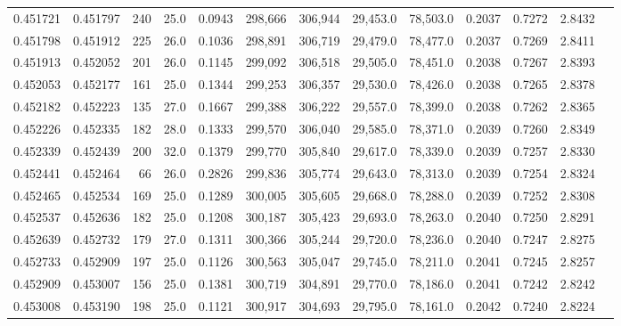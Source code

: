 \begin{tabular}{rrrrrrrrrrrrr}
0.451721 & 0.451797 &   240 & 25.0 &                                     0.0943 & 298,666 & 306,944 &  29,453.0 &  78,503.0 & 0.2037 & 0.7272 & 2.8432 \\
0.451798 & 0.451912 &   225 & 26.0 &                                     0.1036 & 298,891 & 306,719 &  29,479.0 &  78,477.0 & 0.2037 & 0.7269 & 2.8411 \\
0.451913 & 0.452052 &   201 & 26.0 &                                     0.1145 & 299,092 & 306,518 &  29,505.0 &  78,451.0 & 0.2038 & 0.7267 & 2.8393 \\
0.452053 & 0.452177 &   161 & 25.0 &                                     0.1344 & 299,253 & 306,357 &  29,530.0 &  78,426.0 & 0.2038 & 0.7265 & 2.8378 \\
0.452182 & 0.452223 &   135 & 27.0 &                                     0.1667 & 299,388 & 306,222 &  29,557.0 &  78,399.0 & 0.2038 & 0.7262 & 2.8365 \\
0.452226 & 0.452335 &   182 & 28.0 &                                     0.1333 & 299,570 & 306,040 &  29,585.0 &  78,371.0 & 0.2039 & 0.7260 & 2.8349 \\
0.452339 & 0.452439 &   200 & 32.0 &                                     0.1379 & 299,770 & 305,840 &  29,617.0 &  78,339.0 & 0.2039 & 0.7257 & 2.8330 \\
0.452441 & 0.452464 &    66 & 26.0 &                                     0.2826 & 299,836 & 305,774 &  29,643.0 &  78,313.0 & 0.2039 & 0.7254 & 2.8324 \\
0.452465 & 0.452534 &   169 & 25.0 &                                     0.1289 & 300,005 & 305,605 &  29,668.0 &  78,288.0 & 0.2039 & 0.7252 & 2.8308 \\
0.452537 & 0.452636 &   182 & 25.0 &                                     0.1208 & 300,187 & 305,423 &  29,693.0 &  78,263.0 & 0.2040 & 0.7250 & 2.8291 \\
0.452639 & 0.452732 &   179 & 27.0 &                                     0.1311 & 300,366 & 305,244 &  29,720.0 &  78,236.0 & 0.2040 & 0.7247 & 2.8275 \\
0.452733 & 0.452909 &   197 & 25.0 &                                     0.1126 & 300,563 & 305,047 &  29,745.0 &  78,211.0 & 0.2041 & 0.7245 & 2.8257 \\
0.452909 & 0.453007 &   156 & 25.0 &                                     0.1381 & 300,719 & 304,891 &  29,770.0 &  78,186.0 & 0.2041 & 0.7242 & 2.8242 \\
0.453008 & 0.453190 &   198 & 25.0 &                                     0.1121 & 300,917 & 304,693 &  29,795.0 &  78,161.0 & 0.2042 & 0.7240 & 2.8224 \\

\end{tabular}
